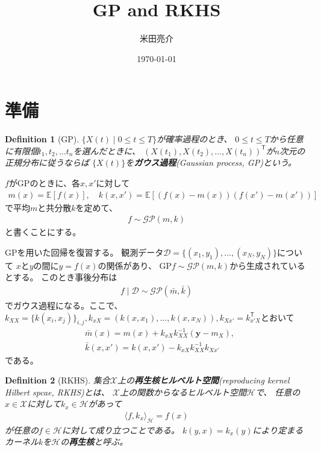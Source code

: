 \documentclass{article}
\title{GP and RKHS}
\author{米田亮介}
\date{\today}
\newtheorem{define}{Definition}[section]
\begin{document}
\maketitle

\section{準備}
\begin{define}[GP]
$\{X(t)\mid 0\leq t\leq T\}$が確率過程のとき、
$0\leq t\leq T$から任意に有限個$t_1,t_2,\dots t_n$を選んだときに、
$(X(t_1),X(t_2),\dots,X(t_n))^\mathsf{T}$が$n$次元の正規分布に従うならば
$\{X(t)\}$を\textbf{ガウス過程}(Gaussian process, GP)という。
\end{define}

$f$がGPのときに、各$x,x'$に対して
\begin{align}
    m(x)=\mathbb{E}[f(x)],\quad k(x,x')=\mathbb{E}[(f(x)-m(x))(f(x')-m(x'))]
\end{align}
で平均$m$と共分散$k$を定めて、
\begin{align}
    f\sim\mathcal{GP}(m,k)
\end{align}
と書くことにする。

GPを用いた回帰を復習する。
観測データ$\mathcal{D}=\{(x_{1},y_{1}),\dots,(x_{N},y_{N})\}$について
$x$と$y$の間に$y=f(x)$の関係があり、
GP$f\sim\mathcal{GP}(m,k)$から生成されているとする。
このとき事後分布は
\begin{align}
    f\mid\mathcal{D}\sim\mathcal{GP}(\bar{m},\bar{k})
\end{align}
でガウス過程になる。ここで、$k_{XX} = \{k(x_{i},x_{j})\}_{i,j},k_{xX}=(k(x,x_{1}),\dots,k(x,x_{N})),k_{Xx'}=k_{x'X}^{\mathsf{T}}$とおいて
\begin{align}
    &\bar{m}(x)=m(x)+k_{xX}k_{XX}^{-1}(\bm{y}-m_{X}),\\
    &\bar{k}(x,x')=k(x,x')-k_{xX}k_{XX}^{-1}k_{Xx'}
\end{align}
である。

\begin{define}[RKHS]
    集合$\mathcal{X}$上の\textbf{再生核ヒルベルト空間}(reproducing kernel Hilbert spcae, RKHS)とは、
    $\mathcal{X}$上の関数からなるヒルベルト空間$\mathcal{H}$で、
    任意の$x\in\mathcal{X}$に対して$k_{x}\in\mathcal{H}$があって
    \begin{align}
        \langle f,k_{x} \rangle_{\mathcal{H}} = f(x)
    \end{align}
    が任意の$f\in\mathcal{H}$に対して成り立つことである。
    $k(y,x)=k_{x}(y)$により定まるカーネル$k$を$\mathcal{H}$の\textbf{再生核}と呼ぶ。
\end{define}
\end{document}
